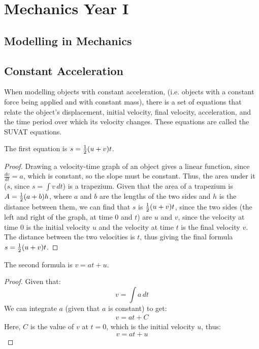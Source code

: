\section{Mechanics Year I} \label{mechanics_i}
\subsection{Modelling in Mechanics} \label{modelling_in_mechanics}

    \newpage

\subsection{Constant Acceleration} \label{constant_acceleration}
    When modelling objects with constant acceleration, (i.e. objects with a constant force being applied and with constant mass), there is a set of equations that relate the object's displacement, initial velocity, final velocity, acceleration, and the time period over which its velocity changes.
    These equations are called the SUVAT equations.

    The first equation is $s=\frac{1}{2}(u+v)t$.
    \begin{proof}
        Drawing a velocity-time graph of an object gives a linear function, since $\frac{dv}{dt}=a$, which is constant, so the slope must be constant.
        Thus, the area under it ($s$, since $s=\int v\,dt$) is a trapezium.
        Given that the area of a trapezium is $A=\frac{1}{2}(a+b)h$, where $a$ and $b$ are the lengths of the two sides and $h$ is the distance between them, we can find that $s$ is $\frac{1}{2}(u+v)t$, since the two sides (the left and right of the graph, at time 0 and $t$) are $u$ and $v$, since the velocity at time 0 is the initial velocity $u$ and the velocity at time $t$ is the final velocity $v$.
        The distance between the two velocities is $t$, thus giving the final formula $s=\frac{1}{2}(u+v)t$.
    \end{proof}

    The second formula is $v=at+u$.
    \begin{proof}
        Given that:
        \begin{equation}
            v=\int a\,dt
        \end{equation}
        We can integrate $a$ (given that $a$ is constant) to get:
        \begin{equation*}
            \begin{aligned}
                v=at+C
            \end{aligned}
        \end{equation*}
        Here, $C$ is the value of $v$ at $t=0$, which is the initial velocity $u$, thus:
        \begin{equation}
            v=at+u
        \end{equation}
    \end{proof}

